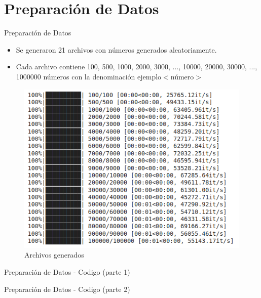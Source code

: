\documentclass[11pt]{beamer}
\begin{document}
	\section{Preparación de Datos}
		\begin{frame}{Preparación de Datos}
			\justifying
			\begin{itemize}
			    \item Se generaron 21 archivos con números generados aleatoriamente.
			    \item Cada archivo contiene 100, 500, 1000, 2000, 3000, ..., 10000, 20000, 30000, ..., 1000000 números con la denominación ejemplo\textunderscore $<$número$>$
			\end{itemize}
			
			\begin{figure}[H]
				\centering
				\includegraphics[scale=0.40]{img/1_preparacion_datos.png}
				\caption{Archivos generados}
				\label{fig: prep_datos_fig1}
			\end{figure}
		\end{frame}
		
		\begin{frame}{Preparación de Datos - Codigo (parte 1)} 
			
		\end{frame}
		\begin{frame}{Preparación de Datos - Codigo (parte 2)} 
			
		\end{frame}
	
\end{document}
